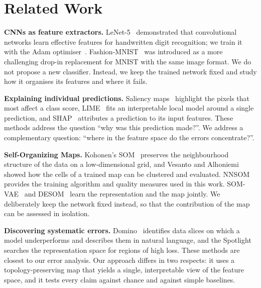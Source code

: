 \documentclass{scrartcl}
\begin{document}
\section{Related Work}\label{sec:related}

\textbf{CNNs as feature extractors.} LeNet-5~\cite{lecun1998gradient} demonstrated that convolutional networks learn effective features for handwritten digit recognition; we train it with the Adam optimiser~\cite{kingma2015adam}. Fashion-MNIST~\cite{xiao2017fashion} was introduced as a more challenging drop-in replacement for MNIST with the same image format. We do not propose a new classifier. Instead, we keep the trained network fixed and study how it organises its features and where it fails.

\textbf{Explaining individual predictions.} Saliency maps~\cite{simonyan2014saliency} highlight the pixels that most affect a class score, LIME~\cite{ribeiro2016lime} fits an interpretable local model around a single prediction, and SHAP~\cite{lundberg2017shap} attributes a prediction to its input features. These methods address the question ``why was this prediction made?''. We address a complementary question: ``where in the feature space do the errors concentrate?''.

\textbf{Self-Organizing Maps.} Kohonen's SOM~\cite{kohonen1990som} preserves the neighbourhood structure of the data on a low-dimensional grid, and Vesanto and Alhoniemi~\cite{vesanto2000clustering} showed how the cells of a trained map can be clustered and evaluated. NNSOM~\cite{jafari_nnsom} provides the training algorithm and quality measures used in this work. SOM-VAE~\cite{fortuin2019somvae} and DESOM~\cite{forest2021desom} learn the representation and the map jointly. We deliberately keep the network fixed instead, so that the contribution of the map can be assessed in isolation.

\textbf{Discovering systematic errors.} Domino~\cite{eyuboglu2022domino} identifies data slices on which a model underperforms and describes them in natural language, and the Spotlight~\cite{deon2022spotlight} searches the representation space for regions of high loss. These methods are closest to our error analysis. Our approach differs in two respects: it uses a topology-preserving map that yields a single, interpretable view of the feature space, and it tests every claim against chance and against simple baselines.
\end{document}
